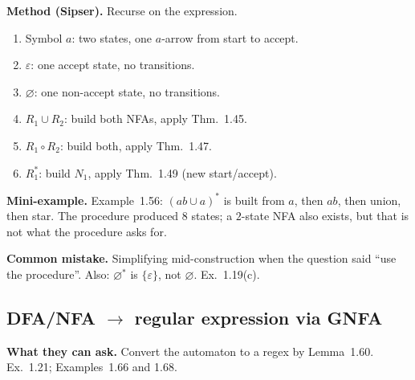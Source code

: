 \documentclass[11pt,a4paper]{article}
\newcommand{\eps}{\varepsilon}
\begin{document}
\textbf{Method (Sipser).}
Recurse on the expression.
\begin{enumerate}
  \item Symbol $a$: two states, one $a$-arrow from start to accept.
  \item $\eps$: one accept state, no transitions.
  \item $\varnothing$: one non-accept state, no transitions.
  \item $R_1\cup R_2$: build both NFAs, apply Thm.~1.45.
  \item $R_1\circ R_2$: build both, apply Thm.~1.47.
  \item $R_1^*$: build $N_1$, apply Thm.~1.49 (new start/accept).
\end{enumerate}

\textbf{Mini-example.}
Example~1.56: $(ab\cup a)^*$ is built from $a$, then $ab$, then
union, then star. The procedure produced $8$ states; a $2$-state NFA
also exists, but that is not what the procedure asks for.

\textbf{Common mistake.}
Simplifying mid-construction when the question said ``use the
procedure''. Also: $\varnothing^*$ is $\{\eps\}$, not $\varnothing$.
Ex.~1.19(c).

\subsection{DFA/NFA $\to$ regular expression via GNFA}
\label{type:gnfa}

\textbf{What they can ask.}
Convert the automaton to a regex by Lemma~1.60. Ex.~1.21;
Examples~1.66 and 1.68.
\end{document}
